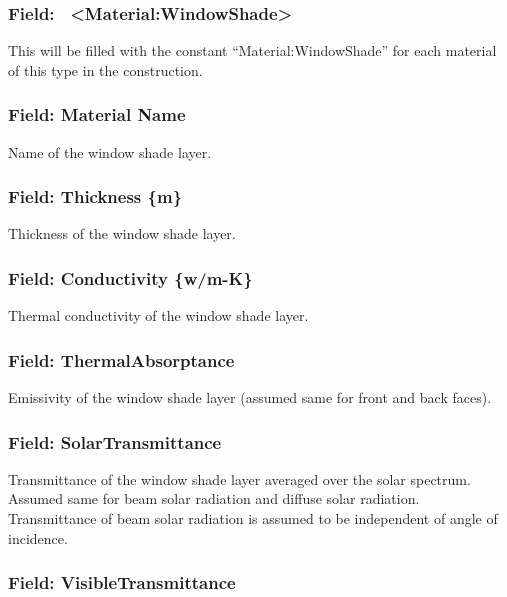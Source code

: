\subsubsection{Field:~ \textless{}Material:WindowShade\textgreater{}}\label{field-materialwindowshade}

This will be filled with the constant ``Material:WindowShade'' for each material of this type in the construction.

\subsubsection{Field: Material Name}\label{field-material-name-4}

Name of the window shade layer.

\subsubsection{Field: Thickness \{m\}}\label{field-thickness-m-2}

Thickness of the window shade layer.

\subsubsection{Field: Conductivity \{w/m-K\}}\label{field-conductivity-wm-k-1}

Thermal conductivity of the window shade layer.

\subsubsection{Field: ThermalAbsorptance}\label{field-thermalabsorptance}

Emissivity of the window shade layer (assumed same for front and back faces).

\subsubsection{Field: SolarTransmittance}\label{field-solartransmittance-1}

Transmittance of the window shade layer averaged over the solar spectrum. Assumed same for beam solar radiation and diffuse solar radiation. Transmittance of beam solar radiation is assumed to be independent of angle of incidence.

\subsubsection{Field: VisibleTransmittance}\label{field-visibletransmittance-1}


